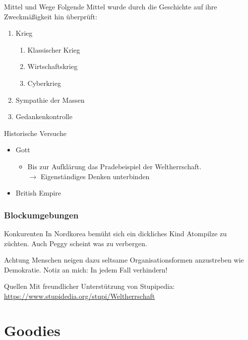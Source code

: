 \documentclass[11pt]{beamer}
\begin{document}
\begin{frame}{Mittel und Wege}
Folgende Mittel wurde durch die Geschichte auf ihre Zweckmäßigkeit hin überprüft:
\begin{enumerate}
	\item Krieg
	\begin{enumerate}
		\item Klassischer Krieg
		\item Wirtschaftskrieg
		\item Cyberkrieg
	\end{enumerate}
	\item Sympathie der Massen
	\item Gedankenkontrolle
\end{enumerate}
\end{frame}
\begin{frame}{Historische Versuche}
\begin{itemize}
\item Gott
\begin{itemize}
	\item Bis zur Aufklärung das Pradebeispiel der Weltherrschaft.\\ $\rightarrow$ Eigenständiges Denken unterbinden
\end{itemize}
\item British Empire
\end{itemize}
\end{frame}
\begin{frame}
\frametitle{Blockumgebungen}
\begin{block}{Konkurenten}
	In Nordkorea bemüht sich ein dickliches Kind Atompilze zu züchten. Auch Peggy scheint was zu verbergen.
\end{block}
\begin{alertblock}{Achtung}
	Menschen neigen dazu seltsame Organisationsformen anzustreben wie Demokratie. Notiz an mich: In jedem Fall verhindern!
\end{alertblock}
\begin{exampleblock}{Quellen}
Mit freundlicher Unterstützung von Stupipedia:\\
\url{https://www.stupidedia.org/stupi/Weltherrschaft}
\end{exampleblock}

\end{frame}
\section{Goodies}
\insertKermit
\insertDilbert
\end{document}
